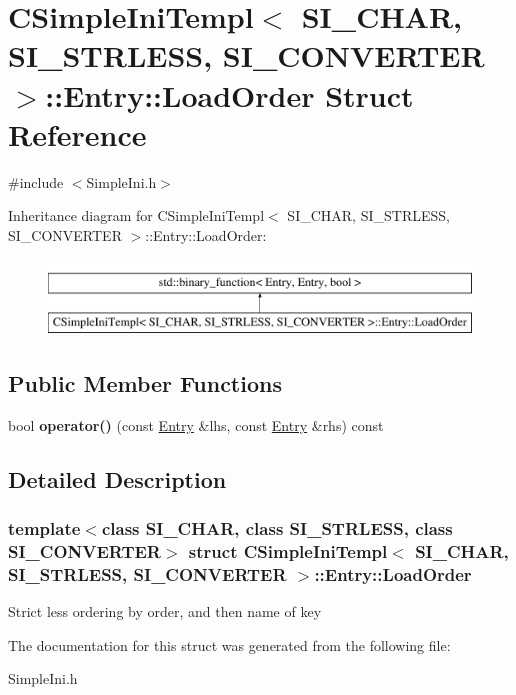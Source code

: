 \hypertarget{a00897}{}\section{C\+Simple\+Ini\+Templ$<$ S\+I\+\_\+\+C\+H\+AR, S\+I\+\_\+\+S\+T\+R\+L\+E\+SS, S\+I\+\_\+\+C\+O\+N\+V\+E\+R\+T\+ER $>$\+:\+:Entry\+:\+:Load\+Order Struct Reference}
\label{a00897}


{\ttfamily \#include $<$Simple\+Ini.\+h$>$}

Inheritance diagram for C\+Simple\+Ini\+Templ$<$ S\+I\+\_\+\+C\+H\+AR, S\+I\+\_\+\+S\+T\+R\+L\+E\+SS, S\+I\+\_\+\+C\+O\+N\+V\+E\+R\+T\+ER $>$\+:\+:Entry\+:\+:Load\+Order\+:\begin{figure}[H]
\begin{center}
\leavevmode
\includegraphics[height=2.000000cm]{a00897}
\end{center}
\end{figure}
\subsection*{Public Member Functions}
\begin{DoxyCompactItemize}
\item 
\mbox{\label{a00897_a51113d39d0dd9c36819d5b3dda2ac148}} 
bool {\bfseries operator()} (const \hyperlink{a00889}{Entry} \&lhs, const \hyperlink{a00889}{Entry} \&rhs) const
\end{DoxyCompactItemize}


\subsection{Detailed Description}
\subsubsection*{template$<$class S\+I\+\_\+\+C\+H\+AR, class S\+I\+\_\+\+S\+T\+R\+L\+E\+SS, class S\+I\+\_\+\+C\+O\+N\+V\+E\+R\+T\+ER$>$\newline
struct C\+Simple\+Ini\+Templ$<$ S\+I\+\_\+\+C\+H\+A\+R, S\+I\+\_\+\+S\+T\+R\+L\+E\+S\+S, S\+I\+\_\+\+C\+O\+N\+V\+E\+R\+T\+E\+R $>$\+::\+Entry\+::\+Load\+Order}

Strict less ordering by order, and then name of key 

The documentation for this struct was generated from the following file\+:\begin{DoxyCompactItemize}
\item 
Simple\+Ini.\+h\end{DoxyCompactItemize}
